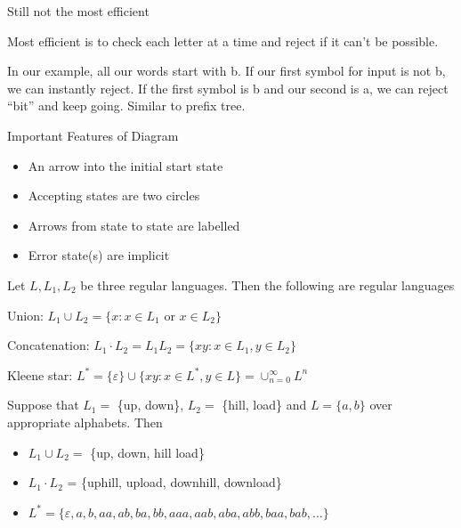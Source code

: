 \documentclass{article}
\begin{document}
Still not the most efficient

Most efficient is to check each letter at a time and reject if it can't
be possible.

In our example, all our words start with b. If our first symbol for
input is not b, we can instantly reject. If the first symbol is b and
our second is a, we can reject ``bit'' and keep going. Similar to prefix
tree.

Important Features of Diagram
\begin{itemize}
    \item An arrow into the initial start state
    \item Accepting states are two circles 
    \item Arrows from state to state are labelled
    \item Error state(s) are implicit
\end{itemize}


Let \(L, L_1, L_2\) be three regular languages. Then the following are
regular languages

Union: \(L_1 \cup L_2 = \{x: x \in L_1 \text{ or } x \in L_2\}\)

Concatenation:
\(L_1 \cdot L_2 = L_1 L_2 = \{xy: x \in L_1, y \in L_2\}\)

Kleene star:
\(L^* = \{\varepsilon\} \cup \{xy: x \in L^*, y \in L\} = \cup_{n=0}^{\infty} L^n\)

Suppose that \(L_1 =\) \{up, down\}, \(L_2 =\) \{hill, load\} and
\(L =\{a,b\}\) over appropriate alphabets. Then

\begin{itemize}
\item
  \(L_1 \cup L_2 =\) \{up, down, hill load\}
\item
  \(L_1 \cdot L_2\) = \{uphill, upload, downhill, download\}
\item
  \(L^* = \{\varepsilon, a, b, aa, ab, ba, bb, aaa, aab, aba, abb, baa, bab, \ldots\}\)
\end{itemize}
\end{document}
